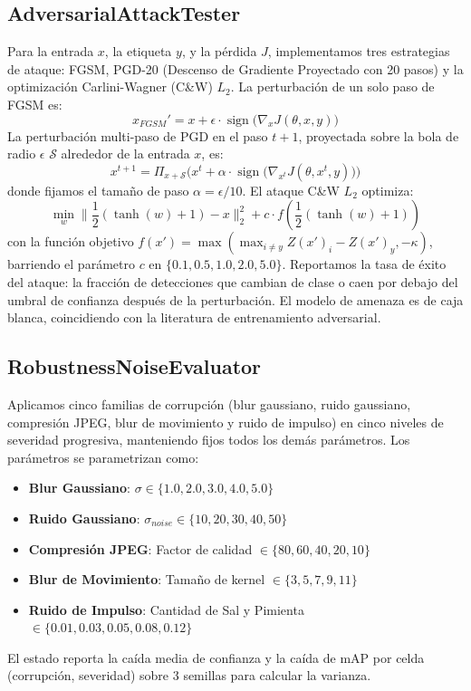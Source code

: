 \documentclass[10pt,twocolumn,letterpaper]{article}
\begin{document}
\subsection{AdversarialAttackTester}
Para la entrada $x$, la etiqueta $y$, y la pérdida $J$, implementamos tres estrategias de ataque: FGSM, PGD-20 (Descenso de Gradiente Proyectado con 20 pasos) y la optimización Carlini-Wagner (C\&W) $L_2$.
La perturbación de un solo paso de FGSM es:
\begin{equation}
    x_{FGSM}' = x + \epsilon \cdot \operatorname{sign}\big(\nabla_x J(\theta, x, y)\big)
\end{equation}
La perturbación multi-paso de PGD en el paso $t+1$, proyectada sobre la bola de radio $\epsilon$ $\mathcal{S}$ alrededor de la entrada $x$, es:
\begin{equation}
    x^{t+1} = \Pi_{x+\mathcal{S}} \Big( x^t + \alpha \cdot \operatorname{sign}\big(\nabla_{x^t} J(\theta, x^t, y)\big) \Big)
\end{equation}
donde fijamos el tamaño de paso $\alpha = \epsilon / 10$. El ataque C\&W $L_2$ optimiza:
\begin{equation}
    \min_{w} \| \frac{1}{2}(\tanh(w)+1) - x \|_2^2 + c \cdot f(\frac{1}{2}(\tanh(w)+1))
\end{equation}
con la función objetivo $f(x') = \max(\max_{i \neq y} Z(x')_i - Z(x')_y, -\kappa)$, barriendo el parámetro $c$ en $\{0.1, 0.5, 1.0, 2.0, 5.0\}$.
Reportamos la tasa de éxito del ataque: la fracción de detecciones que cambian de clase o caen por debajo del umbral de confianza después de la perturbación. El modelo de amenaza es de caja blanca, coincidiendo con la literatura de entrenamiento adversarial.

\subsection{RobustnessNoiseEvaluator}
Aplicamos cinco familias de corrupción (blur gaussiano, ruido gaussiano, compresión JPEG, blur de movimiento y ruido de impulso) en cinco niveles de severidad progresiva, manteniendo fijos todos los demás parámetros. Los parámetros se parametrizan como:
\begin{itemize}
    \item \textbf{Blur Gaussiano}: $\sigma \in \{1.0, 2.0, 3.0, 4.0, 5.0\}$
    \item \textbf{Ruido Gaussiano}: $\sigma_{noise} \in \{10, 20, 30, 40, 50\}$
    \item \textbf{Compresión JPEG}: Factor de calidad $\in \{80, 60, 40, 20, 10\}$
    \item \textbf{Blur de Movimiento}: Tamaño de kernel $\in \{3, 5, 7, 9, 11\}$
    \item \textbf{Ruido de Impulso}: Cantidad de Sal y Pimienta $\in \{0.01, 0.03, 0.05, 0.08, 0.12\}$
\end{itemize}
El estado reporta la caída media de confianza y la caída de mAP por celda (corrupción, severidad) sobre 3 semillas para calcular la varianza.
\end{document}
